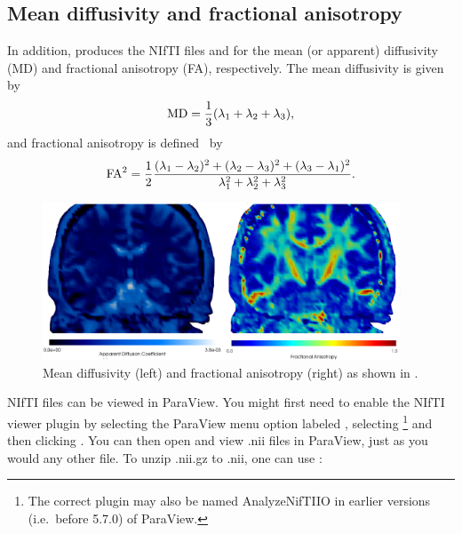 \subsection{Mean diffusivity and fractional anisotropy}
In addition,  produces the NIfTI files
 and  for the mean (or apparent)
diffusivity (MD) and fractional anisotropy (FA), respectively. 
The mean diffusivity is given by 
\begin{equation}\label{eqn:chp5:md}
  \rm{MD} = \frac{1}{3}(\lambda_1 + \lambda_2 + \lambda_3),   
\end{equation}
and  fractional
anisotropy is defined~\cite{kindlmann2007geodesic} by
\begin{equation}\label{eqn:chp5:fa}
	\rm{FA}^2 = \frac{1}{2} \frac{(\lambda_1-\lambda_2)^2 
+ (\lambda_2 - \lambda_3)^2 + (\lambda_3 - \lambda_1)^2}{\lambda_1^2 
+ \lambda_2^2 + \lambda_3^2} . 
\end{equation}
\begin{figure}	
  \begin{center}
    \includegraphics[width=0.95\textwidth]{./graphics/chp5/paraview_adcfa.png}
  \end{center}
  \caption{Mean diffusivity (left) and fractional anisotropy (right) as shown in .}
  \label{fig:chp5:DTIfa}
\end{figure}
NIfTI files can be viewed in ParaView. You might first need to enable
the NIfTI viewer plugin by selecting the ParaView menu option labeled
, selecting %
\footnote{The correct plugin may also be named AnalyzeNifTIIO in earlier 
versions (i.e.~before 5.7.0) of ParaView.} 
 and then clicking . You
can then open and view .nii files in ParaView, just as you would any other
file. To unzip .nii.gz to .nii, one can use :

